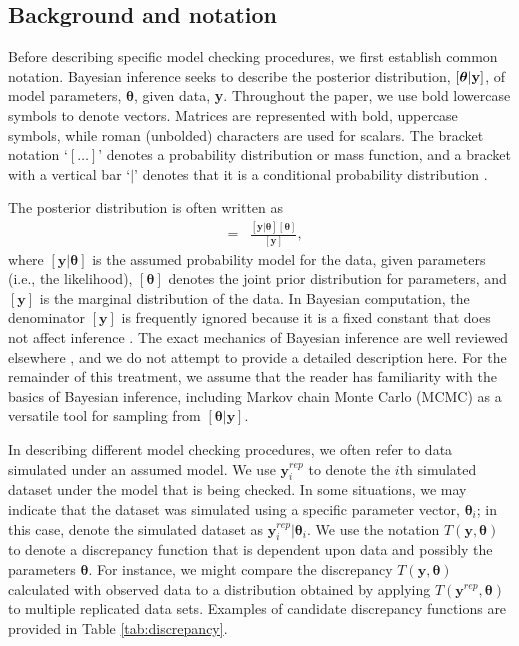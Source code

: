\documentclass[12pt,english]{article}
\begin{document}
\begin{spacing}{1.9}
\section{Background and notation}

Before describing specific model checking procedures, we first
establish common notation.  Bayesian inference seeks to describe the
posterior distribution, $[\boldsymbol{\theta} | {\bf y}]$, of model
parameters, $\boldsymbol{\theta}$, given data, \textbf{y}.  Throughout
the paper, we use bold lowercase symbols to denote vectors.  Matrices
are represented with bold, uppercase symbols, while roman (unbolded)
characters are used for scalars.  The bracket notation `$[ \hdots ]$'
denotes a probability distribution or mass function, and a bracket
with a vertical bar `$|$' denotes that it is a conditional probability
distribution \citep{GelfandSmith1990}.

The posterior distribution is often written as
\begin{eqnarray}
  [\boldsymbol{\theta} | \textbf{y}] & = & \frac{[\textbf{y} | \boldsymbol{\theta}] [\boldsymbol{\theta}]}{[\textbf{y}]},
\end{eqnarray}
where $[\textbf{y}|\boldsymbol{\theta}]$ is the assumed probability
model for the data, given parameters (i.e., the likelihood),
$[\boldsymbol{\theta}]$ denotes the joint prior distribution for
parameters, and $[\textbf{y}]$ is the marginal distribution of the
data.  In Bayesian computation, the denominator $[\textbf{y}]$ is
frequently ignored because it is a fixed constant that does not affect
inference \citep[although it is needed when computing Bayes factors
for model comparison and averaging;][]{LinkBarker2006}.  The exact
mechanics of Bayesian inference are well reviewed elsewhere
\citep[e.g.,][]{KingEtAl2009,LinkBarker2010,HobbsHooten2015}, and we
do not attempt to provide a detailed description here.  For the
remainder of this treatment, we assume that the reader has familiarity
with the basics of Bayesian inference, including Markov chain Monte
Carlo (MCMC) as a versatile tool for sampling from
$[\boldsymbol{\theta}|\textbf{y}]$.

In describing different model checking procedures, we often refer to
data simulated under an assumed model.  We use $\textbf{y}_i^{rep}$ to
denote the $i$th simulated dataset under the model that is being
checked.  In some situations, we may indicate that the dataset was
simulated using a specific parameter vector, $\boldsymbol{\theta}_i$;
in this case, denote the simulated dataset as
$\textbf{y}_i^{rep}|\boldsymbol{\theta}_i$.  We use the notation
$T(\textbf{y},\boldsymbol{\theta})$ to denote a discrepancy function
that is dependent upon data and possibly the parameters
$\boldsymbol{\theta}$.  For instance, we might compare the discrepancy
$T(\textbf{y},\boldsymbol{\theta})$ calculated with observed data to a
distribution obtained by applying
$T(\textbf{y}^{rep},\boldsymbol{\theta})$ to multiple replicated data
sets.  Examples of candidate discrepancy functions are provided in
Table \ref{tab:discrepancy}.


\end{spacing}
\end{document}
